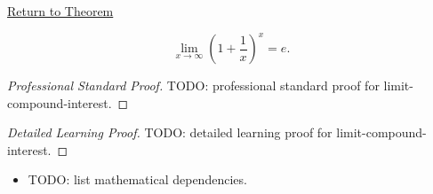 \newpage
{}
\label{prf:limit-compound-interest}

\begin{remark*}[Return]
\hyperref[prop:limit-compound-interest]{Return to Theorem}
\end{remark*}

\begin{theorem*}
\[
  \lim_{x \to \infty} \left(1 + \frac{1}{x}\right)^x = e.
\]

\smallskip\noindent
\end{theorem*}

\begin{proof}[Professional Standard Proof]
\LRAProofBodyStart
TODO: professional standard proof for limit-compound-interest.
\end{proof}

\begin{proof}[Detailed Learning Proof]
\LRAProofBodyStart
TODO: detailed learning proof for limit-compound-interest.
\end{proof}

\begin{remark*}
\end{remark*}

\begin{dependencies}
\begin{itemize}
  \item TODO: list mathematical dependencies.
\end{itemize}
\end{dependencies}

\clearpage
